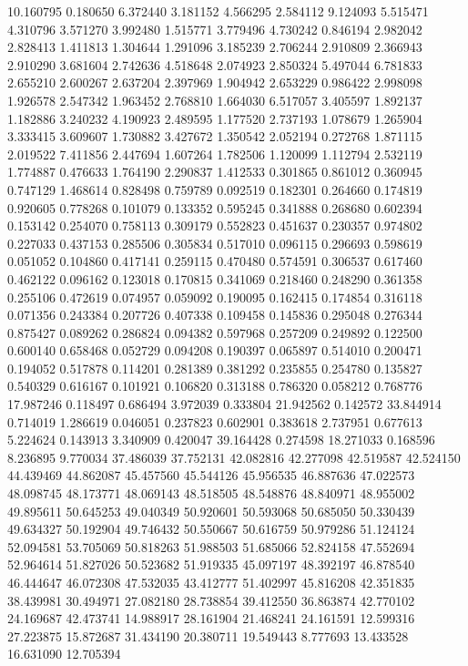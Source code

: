 10.160795
0.180650
6.372440
3.181152
4.566295
2.584112
9.124093
5.515471
4.310796
3.571270
3.992480
1.515771
3.779496
4.730242
0.846194
2.982042
2.828413
1.411813
1.304644
1.291096
3.185239
2.706244
2.910809
2.366943
2.910290
3.681604
2.742636
4.518648
2.074923
2.850324
5.497044
6.781833
2.655210
2.600267
2.637204
2.397969
1.904942
2.653229
0.986422
2.998098
1.926578
2.547342
1.963452
2.768810
1.664030
6.517057
3.405597
1.892137
1.182886
3.240232
4.190923
2.489595
1.177520
2.737193
1.078679
1.265904
3.333415
3.609607
1.730882
3.427672
1.350542
2.052194
0.272768
1.871115
2.019522
7.411856
2.447694
1.607264
1.782506
1.120099
1.112794
2.532119
1.774887
0.476633
1.764190
2.290837
1.412533
0.301865
0.861012
0.360945
0.747129
1.468614
0.828498
0.759789
0.092519
0.182301
0.264660
0.174819
0.920605
0.778268
0.101079
0.133352
0.595245
0.341888
0.268680
0.602394
0.153142
0.254070
0.758113
0.309179
0.552823
0.451637
0.230357
0.974802
0.227033
0.437153
0.285506
0.305834
0.517010
0.096115
0.296693
0.598619
0.051052
0.104860
0.417141
0.259115
0.470480
0.574591
0.306537
0.617460
0.462122
0.096162
0.123018
0.170815
0.341069
0.218460
0.248290
0.361358
0.255106
0.472619
0.074957
0.059092
0.190095
0.162415
0.174854
0.316118
0.071356
0.243384
0.207726
0.407338
0.109458
0.145836
0.295048
0.276344
0.875427
0.089262
0.286824
0.094382
0.597968
0.257209
0.249892
0.122500
0.600140
0.658468
0.052729
0.094208
0.190397
0.065897
0.514010
0.200471
0.194052
0.517878
0.114201
0.281389
0.381292
0.235855
0.254780
0.135827
0.540329
0.616167
0.101921
0.106820
0.313188
0.786320
0.058212
0.768776
17.987246
0.118497
0.686494
3.972039
0.333804
21.942562
0.142572
33.844914
0.714019
1.286619
0.046051
0.237823
0.602901
0.383618
2.737951
0.677613
5.224624
0.143913
3.340909
0.420047
39.164428
0.274598
18.271033
0.168596
8.236895
9.770034
37.486039
37.752131
42.082816
42.277098
42.519587
42.524150
44.439469
44.862087
45.457560
45.544126
45.956535
46.887636
47.022573
48.098745
48.173771
48.069143
48.518505
48.548876
48.840971
48.955002
49.895611
50.645253
49.040349
50.920601
50.593068
50.685050
50.330439
49.634327
50.192904
49.746432
50.550667
50.616759
50.979286
51.124124
52.094581
53.705069
50.818263
51.988503
51.685066
52.824158
47.552694
52.964614
51.827026
50.523682
51.919335
45.097197
48.392197
46.878540
46.444647
46.072308
47.532035
43.412777
51.402997
45.816208
42.351835
38.439981
30.494971
27.082180
28.738854
39.412550
36.863874
42.770102
24.169687
42.473741
14.988917
28.161904
21.468241
24.161591
12.599316
27.223875
15.872687
31.434190
20.380711
19.549443
8.777693
13.433528
16.631090
12.705394
